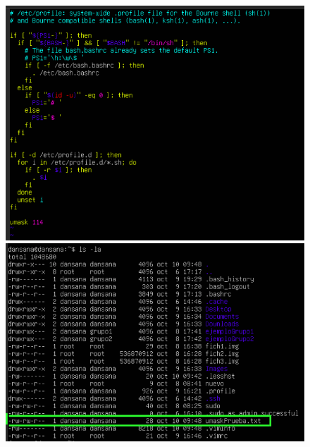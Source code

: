 \documentclass[10pt]{article}
\begin{document}
	\begin{figure}[H]
		\centering
		\begin{minipage}{0.48\textwidth}
			\centering
			\includegraphics[width=\linewidth]{Recursos/etcProfile.png}
		\end{minipage}\hfill
		\begin{minipage}{0.48\textwidth}
			\centering
			\includegraphics[width=\linewidth]{Recursos/umaskPrueba.png}
		\end{minipage}
	\end{figure}
	\clearpage
	
\end{document}
